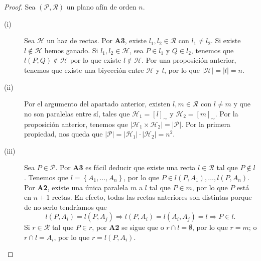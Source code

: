 \begin{proof}
Sea $\displaystyle \left(\mathcal{P}, \mathcal{R}\right) $ un plano afín de orden $\displaystyle n $.
\begin{description}
\item[(i)] Sea $\displaystyle \mathcal{H} $ un haz de rectas. Por \textbf{A3}, existe $\displaystyle l_{1}, l_{2} \in \mathcal{R} $ con $\displaystyle l_{1} \neq l_{2} $. Si existe $\displaystyle l \not\in \mathcal{H} $ hemos ganado. Si $\displaystyle l_{1}, l_{2} \in \mathcal{H} $, sea $\displaystyle P \in l_{1} $ y $\displaystyle Q\in l_{2} $, tenemos que $\displaystyle l\left(P,Q\right) \not\in \mathcal{H} $ por lo que existe $\displaystyle l \not\in \mathcal{H} $. Por una proposición anterior, tenemos que existe una biyección entre $\displaystyle \mathcal{H}  $ y $\displaystyle l $, por lo que $\displaystyle \left|\mathcal{H}\right| = \left|l\right| = n $.
\item[(ii)] Por el argumento del apartado anterior, existen $\displaystyle l, m \in \mathcal{R} $ con $\displaystyle l \neq m $ y que no son paralelas entre sí, tales que $\displaystyle \mathcal{H}_{1} = \left[l\right]_{\sim}  $ y $\displaystyle \mathcal{H}_{2} = \left[m\right]_{\sim}  $. Por la proposición anterior, tenemos que $\displaystyle \left|\mathcal{H}_{1} \times \mathcal{H}_{2}\right| = \left|\mathcal{P}\right| $. Por la primera propiedad, nos queda que $\displaystyle \left|\mathcal{P}\right| = \left|\mathcal{H}_{1}\right| \cdot \left|\mathcal{H}_{2}\right| = n^{2} $.
\item[(iii)] Sea $\displaystyle P \in \mathcal{P} $. Por \textbf{A3} es fácil deducir que existe una recta $\displaystyle l \in \mathcal{R} $ tal que $\displaystyle P \not\in l $. Tenemos que $\displaystyle l = \left\{ A_{1}, \ldots, A_{n}\right\}  $, por lo que $\displaystyle P \in l\left(P, A_{1}\right), \ldots, l\left(P, A_{n}\right) $. 
	Por \textbf{A2}, existe una única paralela $\displaystyle m $ a $\displaystyle l $ tal que $\displaystyle P \in m $, por lo que $\displaystyle P $ está en $\displaystyle n + 1 $ rectas. En efecto, todas las rectas anteriores son distintas porque de no serlo tendríamos que 
	\[l\left(P, A_{i}\right) = l\left(P, A_{j}\right) \Rightarrow l\left(P, A_{i}\right) = l\left(A_{i}, A_{j}\right) = l \Rightarrow P \in l .\]
	Si $\displaystyle r \in \mathcal{R} $ tal que $\displaystyle P \in r $, por \textbf{A2} se sigue que o $\displaystyle r \cap l = \emptyset $, por lo que $\displaystyle r = m $; o $\displaystyle r \cap l = A_{i} $, por lo que $\displaystyle r = l\left(P, A_{i}\right) $.

\end{description}
\end{proof}
